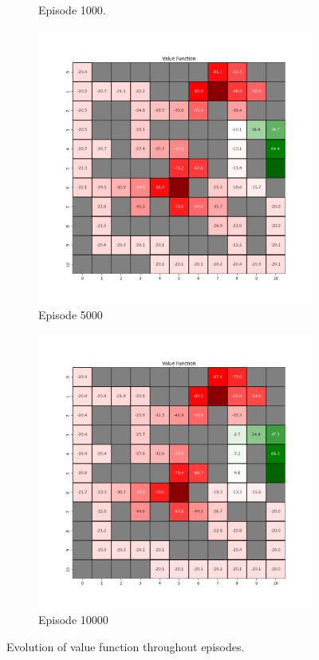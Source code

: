 \documentclass{assignment}
\begin{document}
\begin{figure}[H]
\begin{subfigure}{0.3\textwidth}
    \caption{Episode 1000.}
    \end{subfigure}\hfill
    \begin{subfigure}{0.3\textwidth}
        \includegraphics[width=\textwidth]{figures/value_td/epsilon_sweep/value_function_alpha_0.1_gamma_0.95_epsilon_0.8_iteration_5000.png}
    \caption{Episode 5000}
    \end{subfigure}\hfill
    \begin{subfigure}{0.3\textwidth}
        \includegraphics[width=\textwidth]{figures/value_td/epsilon_sweep/value_function_alpha_0.1_gamma_0.95_epsilon_0.8_iteration_10000.png}
    \caption{Episode 10000}
    \end{subfigure}
    \caption{Evolution of value function throughout episodes.}
    \label{fig:epsilon_0.8_td_learning_value}
\end{figure}
\end{document}
